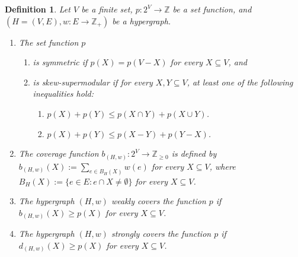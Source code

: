 \documentclass{article}
\newtheorem{definition}{Definition}[section]
\newcommand{\shubhang}[1]{{\color{blue}[{\tiny Shubhang: \bf #1}]\marginpar{\color{blue}*}}}
\newcommand{\knote}[1]{{\color{red}[{\tiny Karthik: \bf #1}]\marginpar{\color{red}*}}}
\newcommand{\kristof}[1]{{\color{purple}[{\tiny Kristof: \bf #1}]\marginpar{\color{red}*}}}
\providecommand{\Z}{\mathbb{Z}}
\begin{document}
\begin{definition}
    Let $V$ be a finite set, $p: 2^V\rightarrow \Z$ be a set function,  and $(H=(V, E), w:E\rightarrow \Z_+)$ be a hypergraph. 
\begin{enumerate}
    \item The set function $p$
    \begin{enumerate}
    \item is \emph{symmetric} if $p(X)=p(V-X)$ for every $X\subseteq V$, and 
    \item is \emph{skew-supermodular} if for every $X, Y\subseteq V$, at least one of the following inequalities hold: 
    \begin{enumerate}
    \item $p(X) + p(Y) \leq p(X\cap Y) + p(X\cup Y)$. %
    \item $p(X) + p(Y) \leq p(X - Y) + p(Y - X)$. %
\end{enumerate}
\end{enumerate}
    \item The coverage function $b_{(H, w)}:2^V\rightarrow \Z_{\ge 0}$ is defined by $b_{(H,w)}(X):=\sum_{e\in B_H(X)}w(e)$ for every $X\subseteq V$, where $B_H(X):=\{e\in E: e\cap X\neq \emptyset\}$ for every $X\subseteq V$. 
    \item The hypergraph $(H, w)$ \emph{weakly covers} the function $p$ if $b_{(H, w)}(X)\ge p(X)$ for every $X\subseteq V$. 
    \item The hypergraph $(H, w)$ \emph{strongly covers} the function $p$ if $d_{(H, w)}(X)\ge p(X)$ for every $X\subseteq V$. 
\end{enumerate}
\end{definition}
\end{document}
